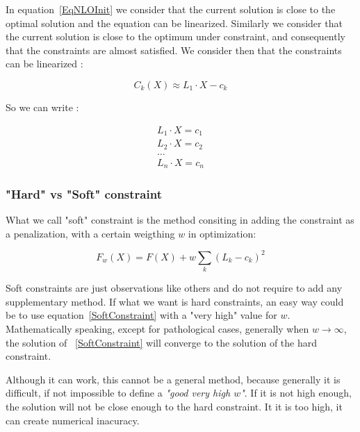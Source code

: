 In  equation~\ref{EqNLOInit} we consider that the current solution is
close to the optimal solution and the equation can be linearized.
Similarly we consider that the current solution is close to the 
optimum under constraint, and consequently that the constraints are almost satisfied.
We consider then that the constraints can be linearized :

\begin{equation} 
C_k(X) \approx L_1 \cdot X  - c_k
\end{equation} 

So we can write :

\begin{equation} 
\begin{split}
  L_1 \cdot X = c_1 \\
  L_2 \cdot X = c_2 \\
    \dots \\
  L_n \cdot X = c_n 
\end{split}
\end{equation}


\subsubsection{"Hard" vs "Soft" constraint}

What we call "soft" constraint is the method consiting in adding
the constraint as a penalization, with a certain weigthing $w$  in optimization:

\begin{equation}
    F_w(X) = F(X) + w  \sum_k (L_k-c_k)^2 \label{SoftConstraint}
\end{equation}

Soft constraints are just observations like others and do not require
to add any supplementary method. If what we want is hard constraints, an
easy way could be to use equation~\ref{SoftConstraint} with a "very high"
value for $w$.   Mathematically speaking, except for pathological cases,
generally when $w \rightarrow \infty$, the solution of ~\ref{SoftConstraint}
will converge to the solution of the hard constraint.

Although it can work, this cannot be a general method, because generally
it is difficult, if not impossible to define a \emph{"good very high $w$"}.
If it is not high enough, the solution will not be close enough to the hard
constraint.  It it is too high, it can create numerical inacuracy.

